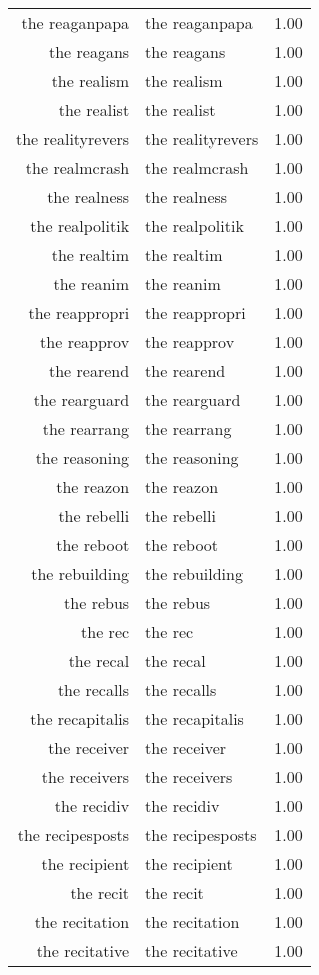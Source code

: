 \begin{table}[ht]
\begin{tabular}{rlr}
  the reaganpapa & the reaganpapa & 1.00 \\ 
  the reagans & the reagans & 1.00 \\ 
  the realism & the realism & 1.00 \\ 
  the realist & the realist & 1.00 \\ 
  the realityrevers & the realityrevers & 1.00 \\ 
  the realmcrash & the realmcrash & 1.00 \\ 
  the realness & the realness & 1.00 \\ 
  the realpolitik & the realpolitik & 1.00 \\ 
  the realtim & the realtim & 1.00 \\ 
  the reanim & the reanim & 1.00 \\ 
  the reappropri & the reappropri & 1.00 \\ 
  the reapprov & the reapprov & 1.00 \\ 
  the rearend & the rearend & 1.00 \\ 
  the rearguard & the rearguard & 1.00 \\ 
  the rearrang & the rearrang & 1.00 \\ 
  the reasoning & the reasoning & 1.00 \\ 
  the reazon & the reazon & 1.00 \\ 
  the rebelli & the rebelli & 1.00 \\ 
  the reboot & the reboot & 1.00 \\ 
  the rebuilding & the rebuilding & 1.00 \\ 
  the rebus & the rebus & 1.00 \\ 
  the rec & the rec & 1.00 \\ 
  the recal & the recal & 1.00 \\ 
  the recalls & the recalls & 1.00 \\ 
  the recapitalis & the recapitalis & 1.00 \\ 
  the receiver & the receiver & 1.00 \\ 
  the receivers & the receivers & 1.00 \\ 
  the recidiv & the recidiv & 1.00 \\ 
  the recipesposts & the recipesposts & 1.00 \\ 
  the recipient & the recipient & 1.00 \\ 
  the recit & the recit & 1.00 \\ 
  the recitation & the recitation & 1.00 \\ 
  the recitative & the recitative & 1.00 \\ 

\end{tabular}
\end{table}
